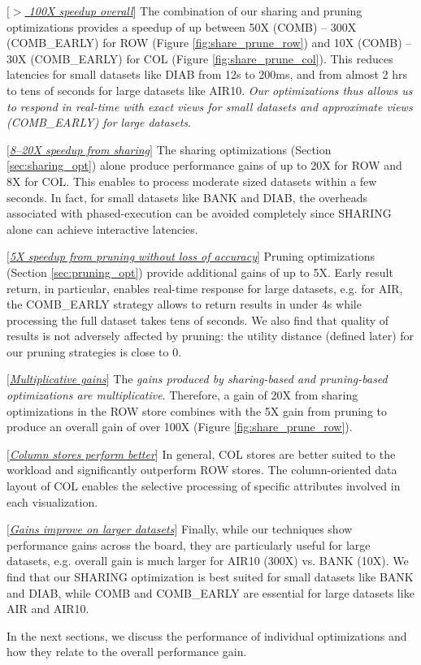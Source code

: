 \begin{denselist} 
\item $[$\underline{\em $>$ 100X speedup overall}$]$ The combination of our sharing and pruning optimizations provides a speedup of up 
between 50X (COMB) -- 300X (COMB\_EARLY) for ROW (Figure \ref{fig:share_prune_row}) and 
10X (COMB) -- 30X (COMB\_EARLY) for COL (Figure \ref{fig:share_prune_col}).
This reduces latencies for small datasets like DIAB from 12s to 200ms, and from almost 2 hrs to tens of seconds for large datasets 
like AIR10. 
{\it Our optimizations thus allows us to respond in real-time with exact views for small datasets and approximate views (COMB\_EARLY) for large datasets}.
\item $[$\underline{\em 8--20X speedup from sharing}$]$ The sharing optimizations (Section \ref{sec:sharing_opt}) alone produce performance gains of up to 20X for ROW and 8X for COL. This enables \SeeDB to process moderate sized datasets within a few seconds.
In fact, for small datasets like BANK and DIAB, the overheads associated with phased-execution can be avoided completely since SHARING
alone can achieve interactive latencies.
\item $[$\underline{\em 5X speedup from pruning without loss of accuracy}$]$ Pruning optimizations (Section \ref{sec:pruning_opt}) provide additional gains of up to 5X. Early result return, in particular, enables real-time response for large datasets, e.g. for AIR, the COMB\_EARLY strategy allows \SeeDB to return results in under 4s while processing the full dataset takes tens of seconds. We also find that quality of results is not adversely affected by pruning: the utility distance (defined later) for our pruning strategies is close to 0.
\item $[$\underline{\em Multiplicative gains}$]$ The {\it gains produced by sharing-based and pruning-based optimizations are multiplicative}. Therefore, a gain of 20X from sharing optimizations in the ROW store combines with the 5X gain from pruning to produce an overall gain of over 100X (Figure \ref{fig:share_prune_row}).
\item $[$\underline{\em Column stores perform better}$]$ In general, COL stores are better suited to the \SeeDB workload and 
significantly outperform ROW stores. The column-oriented data layout of COL enables the selective processing of specific attributes involved in each visualization. 
\item $[$\underline{\em Gains improve on larger datasets}$]$ Finally, while our techniques show performance gains across the board, they are particularly useful for large datasets, e.g. overall gain is much larger for AIR10 (300X) vs. BANK (10X). We find that our SHARING optimization is best suited for small datasets like BANK and DIAB, while COMB and COMB\_EARLY are essential for large datasets like AIR and AIR10.
\end{denselist}



In the next sections, we discuss the performance of individual optimizations and how they relate to the overall performance gain.



